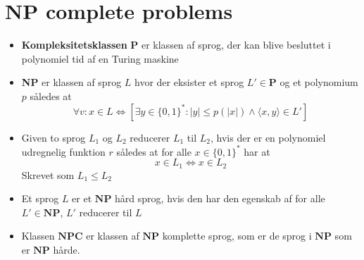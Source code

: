 \section{NP complete problems}
\begin{itemize}
	\item \textbf{Kompleksitetsklassen} $\mathbf P$ er klassen af sprog, der kan blive besluttet i polynomiel tid af en Turing maskine
	\item \textbf{NP} er klassen af sprog $L$ hvor der eksister et sprog $L' \in \mathbf P$ og et polynomium $p$ således at
  \begin{equation*}
    \forall v: x \in L \Leftrightarrow [\exists y \in \{0,1\}^* : |y| \leq p(|x|) \land \langle x, y \rangle \in L']
  \end{equation*}
  \item Given to sprog $L_1$ og $L_2$ reducerer $L_1$ til $L_2$, hvis der er en polynomiel udregnelig funktion $r$ således at for alle $x \in \{0,1\}^*$ har at
  \begin{equation*}
    x \in L_1 \Leftrightarrow x \in L_2
  \end{equation*}
  Skrevet som $L_1 \leq L_2$ 
  \item Et sprog $L$ er et $\mathbf{NP}$ hård sprog, hvis den har den egenskab af for alle $L' \in \mathbf{NP}$, $L'$ reducerer til $L$ 
  \item Klassen $\mathbf{NPC}$ er klassen af $\mathbf{NP}$ komplette sprog, som er de sprog i $\mathbf{NP}$ som er $\mathbf{NP}$ hårde.
\end{itemize}

